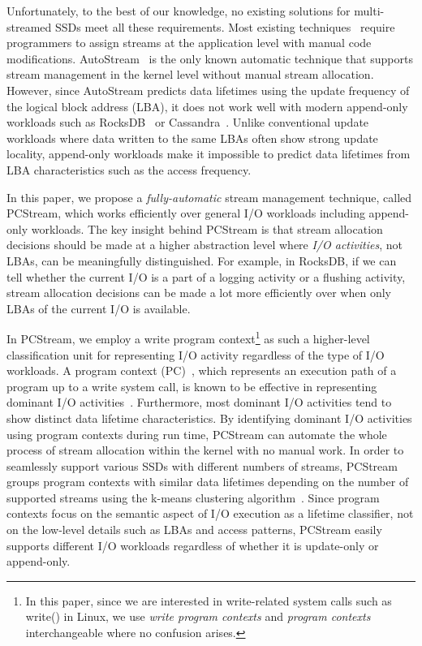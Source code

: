 Unfortunately, to the best of our knowledge, no existing solutions  for
multi-streamed SSDs meet all these requirements.  
Most existing techniques~\cite{MultiStream, Level, FStream, vStream} require 
programmers to assign streams at the application level with manual code modifications.
\textsf{\small AutoStream}~\cite{AutoStream} is the only known automatic technique 
that supports stream management in the kernel level without manual stream allocation.
However, since \textsf{\small AutoStream} predicts data lifetimes using the update frequency 
of the logical block address (LBA), it does not work well with modern append-only workloads 
such as RocksDB~\cite{RocksDB} or Cassandra~\cite{Cassandra}.  
Unlike conventional update workloads where data written to the same LBAs 
often show strong update locality, 
append-only workloads make it impossible to predict data lifetimes 
from LBA characteristics such as the access frequency.

In this paper, we propose a {\it fully-automatic} stream management technique, 
called \textsf{\small PCStream}, which works efficiently over general I/O workloads including 
append-only workloads.   
The key insight behind \textsf{\small PCStream} is that stream allocation decisions should be made 
at a higher abstraction level where {\it I/O activities}, not LBAs, can be meaningfully distinguished.
For example, in RocksDB, if we can tell whether the current I/O is a part of 
a logging activity or a flushing activity, stream allocation decisions can be made 
a lot more efficiently over when only LBAs of the current I/O is
available.   

In \textsf{\small PCStream}, we employ a write program context\footnote{In this paper, since we are 
interested in write-related system calls such as write() in Linux, 
we use {\it write program contexts} and {\it
program contexts} interchangeable where no confusion arises.} as such a higher-level 
classification unit for representing I/O activity regardless of the type of I/O workloads. 
A program context (PC)~\cite{PC, PC2}, which represents an execution path of a program 
up to a write system call,
is known to be effective in 
{\color{blue}
representing dominant I/O activities~\cite{PCHa}.  
Furthermore, most dominant I/O activities tend to show distinct data lifetime characteristics.
}
By identifying dominant I/O activities using program contexts during run time, 
\textsf{\small PCStream} can automate the whole process of stream allocation within the 
kernel with no manual work.  In order to
seamlessly support various SSDs with different numbers of streams, \textsf{\small PCStream} 
groups program contexts with similar data lifetimes 
depending on the number of supported streams
using the k-means clustering algorithm~\cite{kmeans}. 
Since program contexts focus on the semantic aspect of I/O execution as a lifetime
classifier, not on the low-level details such as LBAs and access patterns, 
\textsf{\small PCStream} easily 
supports different I/O workloads regardless of whether it is update-only or append-only.   

